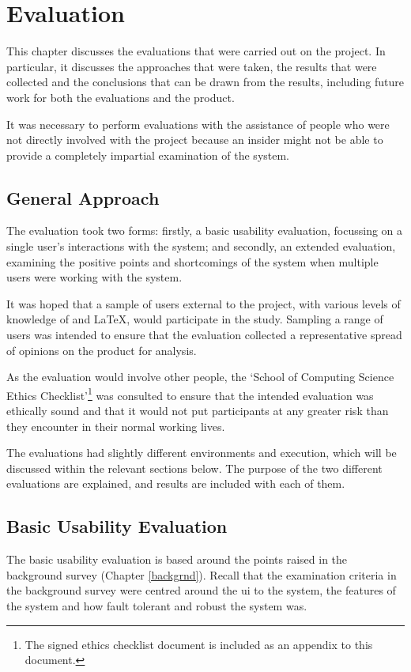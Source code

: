 \chapter{Evaluation}
\label{eval}
This chapter discusses the evaluations that were carried out on the project.  In particular, it discusses the approaches that were taken, the results that were collected and the conclusions that can be drawn from the results, including future work for both the evaluations and the product.

It was necessary to perform evaluations with the assistance of people who were not directly involved with the project because an insider might not be able to provide a completely impartial examination of the system.

\section{General Approach}
The evaluation took two forms: firstly, a basic usability evaluation, focussing on a single user's interactions with the system; and secondly, an extended evaluation, examining the positive points and shortcomings of the system when multiple users were working with the system.

It was hoped that a sample of users external to the project, with various levels of knowledge of \bibtex and \LaTeX, would participate in the study.  Sampling a range of users was intended to ensure that the evaluation collected a representative spread of opinions on the product for analysis.

As the evaluation would involve other people, the `School of Computing Science Ethics Checklist'\footnote{The signed ethics checklist document is included as an appendix to this document.} was consulted to ensure that the intended evaluation was ethically sound and that it would not put participants at any greater risk than they encounter in their normal working lives.

The evaluations had slightly different environments and execution, which will be discussed within the relevant sections below.  The purpose of the two different evaluations are explained, and results are included with each of them.

\section{Basic Usability Evaluation}
The basic usability evaluation is based around the points raised in the background survey (Chapter \ref{backgrnd}).  Recall that the examination criteria in the background survey were centred around the \gls{ui} to the system, the features of the system and how fault tolerant and robust the system was.


